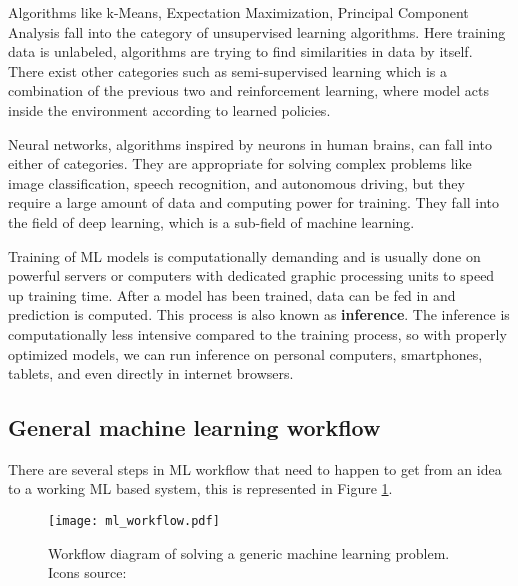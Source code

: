 Algorithms like k-Means, Expectation Maximization, Principal Component Analysis fall into the category of unsupervised learning algorithms.
Here training data is unlabeled, algorithms are trying to find similarities in data by itself\cite{geron}.
There exist other categories such as semi-supervised learning which is a combination of the previous two and reinforcement learning, where model acts inside the environment according to learned policies\cite{geron}.

Neural networks, algorithms inspired by neurons in human brains\cite{geron}\cite{cs231n}, can fall into either of categories. 
They are appropriate for solving complex problems like image classification, speech recognition, and autonomous driving, but they require a large amount of data and computing power for training.
They fall into the field of deep learning, which is a sub-field of machine learning.

Training of ML models is computationally demanding and is usually done on powerful servers or computers with dedicated graphic processing units to speed up training time.
After a model has been trained, data can be fed in and prediction is computed. 
This process is also known as \textbf{inference}.
The inference is computationally less intensive compared to the training process, so with properly optimized models, we can run inference on personal computers, smartphones, tablets, and even directly in internet browsers.


\subsection{ General machine learning workflow}

There are several steps in ML workflow that need to happen to get from an idea to a working ML based system, this is represented in Figure \ref{ml_workflow}.

\begin{figure}[ht]
        \centering
        \texttt{[image: ml\_workflow.pdf]} 
        \caption[Workflow diagram of solving a generic machine learning problem.] {Workflow diagram of solving a generic machine learning problem. Icons source:\cite{icons}}
        \label{ml_workflow}
\end{figure}

